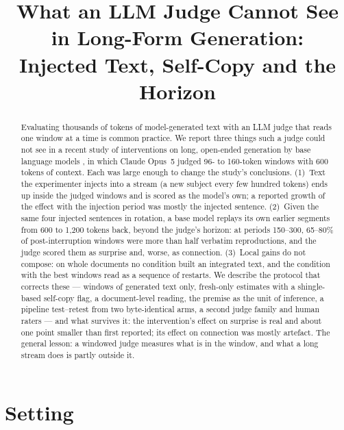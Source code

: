 \documentclass{article}
\title{What an LLM Judge Cannot See in Long-Form Generation:\\ Injected Text, Self-Copy and the Horizon}
\begin{document}
\maketitle

\begin{abstract}
Evaluating thousands of tokens of model-generated text with an LLM judge that
reads one window at a time is common practice. We report three things such a
judge could not see in a recent study of interventions on long, open-ended
generation by base language models \citep{ono2026interrupting}, in which
Claude Opus~5 judged 96- to 160-token windows with 600 tokens of context.
Each was large enough to change the study's conclusions. (1)~Text the
experimenter injects into a stream (a new subject every few hundred tokens)
ends up inside the judged windows and is scored as the model's own; a
reported growth of the effect with the injection period was mostly the
injected sentence. (2)~Given the same four injected sentences in rotation, a
base model replays its own earlier segments from 600 to 1{,}200 tokens back,
beyond the judge's horizon: at periods 150--300, 65--80\% of
post-interruption windows were more than half verbatim reproductions, and the
judge scored them as surprise and, worse, as connection. (3)~Local gains do
not compose: on whole documents no condition built an integrated text, and
the condition with the best windows read as a sequence of restarts. We
describe the protocol that corrects these --- windows of generated text only,
fresh-only estimates with a shingle-based self-copy flag, a document-level
reading, the premise as the unit of inference, a pipeline test--retest from
two byte-identical arms, a second judge family and human raters --- and what
survives it: the intervention's effect on surprise is real and about one
point smaller than first reported; its effect on connection was mostly
artefact. The general lesson: a windowed judge measures what is in the
window, and what a long stream does is partly outside it.
\end{abstract}

\section{Setting}
\end{document}
